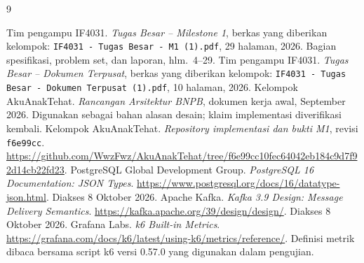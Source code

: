 \begin{thebibliography}{9}
 Tim pengampu IF4031. \emph{Tugas Besar -- Milestone 1}, berkas yang diberikan kelompok: \texttt{IF4031 - Tugas Besar - M1 (1).pdf}, 29 halaman, 2026. Bagian spesifikasi, problem set, dan laporan, hlm.~4--29.
 Tim pengampu IF4031. \emph{Tugas Besar -- Dokumen Terpusat}, berkas yang diberikan kelompok: \texttt{IF4031 - Tugas Besar - Dokumen Terpusat (1).pdf}, 10 halaman, 2026.
 Kelompok AkuAnakTehat. \emph{Rancangan Arsitektur BNPB}, dokumen kerja awal, September 2026. Digunakan sebagai bahan alasan desain; klaim implementasi diverifikasi kembali.
 Kelompok AkuAnakTehat. \emph{Repository implementasi dan bukti M1}, revisi \texttt{f6e99cc}. \url{https://github.com/WwzFwz/AkuAnakTehat/tree/f6e99cc10fec64042eb184c9d7f92d14cb22fd23}.
 PostgreSQL Global Development Group. \emph{PostgreSQL 16 Documentation: JSON Types}. \url{https://www.postgresql.org/docs/16/datatype-json.html}. Diakses 8 Oktober 2026.
 Apache Kafka. \emph{Kafka 3.9 Design: Message Delivery Semantics}. \url{https://kafka.apache.org/39/design/design/}. Diakses 8 Oktober 2026.
 Grafana Labs. \emph{k6 Built-in Metrics}. \url{https://grafana.com/docs/k6/latest/using-k6/metrics/reference/}. Definisi metrik dibaca bersama script k6 versi 0.57.0 yang digunakan dalam pengujian.
\end{thebibliography}
